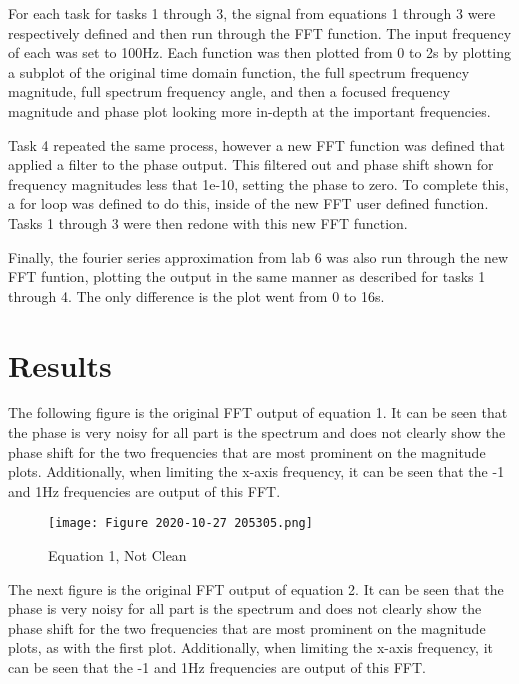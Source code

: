 \documentclass[12pt, titlepage]{article}
\begin{document}
    For each task for tasks 1 through 3, the signal from equations 1 through 3 were respectively defined and then run through the FFT function.  The input frequency of each was set to 100Hz.  Each function was then plotted from 0 to 2s by plotting a subplot of the original time domain function, the full spectrum frequency magnitude, full spectrum frequency angle, and then a focused frequency magnitude and phase plot looking more in-depth at the important frequencies.  
    
    Task 4 repeated the same process, however a new FFT function was defined that applied a filter to the phase output.  This filtered out and phase shift shown for frequency magnitudes less that 1e-10, setting the phase to zero.  To complete this, a for loop was defined to do this, inside of the new FFT user defined function.  Tasks 1 through 3 were then redone with this new FFT function.
    
    Finally, the fourier series approximation from lab 6 was also run through the new FFT funtion, plotting the output in the same manner as described for tasks 1 through 4.  The only difference is the plot went from 0 to 16s.
   
    \section{Results}
    The following figure is the original FFT output of equation 1.  It can be seen that the phase is very noisy for all part is the spectrum and does not clearly show the phase shift for the two frequencies that are most prominent on the magnitude plots.  Additionally, when limiting the x-axis frequency, it can be seen that the -1 and 1Hz frequencies are output of this FFT.
   
        \begin{figure}[h!]
            \centering
            \texttt{[image: Figure 2020-10-27 205305.png]}
            \caption{Equation 1, Not Clean}
            \label{fig:my_label}
        \end{figure}
    
    \clearpage
    The next figure is the original FFT output of equation 2.  It can be seen that the phase is very noisy for all part is the spectrum and does not clearly show the phase shift for the two frequencies that are most prominent on the magnitude plots, as with the first plot.  Additionally, when limiting the x-axis frequency, it can be seen that the -1 and 1Hz frequencies are output of this FFT.
    
\end{document}
